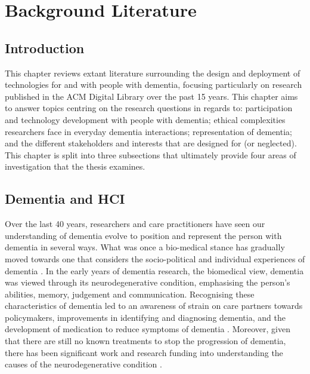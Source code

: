 \chapter{Background Literature}
\label{BackgroundLit}

\section{Introduction}
\label{BL:Intro}
This chapter reviews extant literature surrounding the design and deployment of technologies for and with people with dementia, focusing particularly on research published in the ACM Digital Library over the past 15 years. This chapter aims to answer topics centring on the research questions in regards to: participation and technology development with people with dementia; ethical complexities researchers face in everyday dementia interactions; representation of dementia; and the different stakeholders and interests that are designed for (or neglected). This chapter is split into three subsections that ultimately provide four areas of investigation that the thesis examines.


\section{Dementia and HCI}
\label{BL:DementiaHCI}
Over the last 40 years, researchers and care practitioners have seen our understanding of dementia evolve to position and represent the person with dementia in several ways. What was once a bio-medical stance has gradually moved towards one that considers the socio-political and individual experiences of dementia \citep{bellass_broadening_2019} . In the early years of dementia research, the biomedical view, dementia was viewed through its neurodegenerative condition, emphasising the person's abilities, memory, judgement and communication. Recognising these characteristics of dementia led to an awareness of strain on care partners towards policymakers, improvements in identifying and diagnosing dementia, and the development of medication to reduce symptoms of dementia \citep{doi:10.1080/13607863.2019.1693968}. Moreover, given that there are still no known treatments to stop the progression of dementia, there has been significant work and research funding into understanding the causes of the neurodegenerative condition \citep{bature_signs_2017}.

